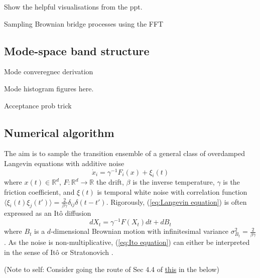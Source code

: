 Show the helpful visualisations from the ppt.

Sampling Brownian bridge processes using the FFT

\subsection{Mode-space band structure}

Mode converegnec derivation

Mode histogram figures here.

Acceptance prob trick

\subsection{Numerical algorithm} \label{sec:Numerical algorithm}
 

The aim is to sample the transition ensemble of a general class of overdamped Langevin equations with additive noise
\begin{equation} \label{eq:Langevin equation}
\dot{x}_i = \gamma^{-1} F_i(x) + \xi_i(t)
\end{equation}
where $x(t) \in \mathbb{R}^d$, $F : \mathbb{R}^d \to \mathbb{R}$ the drift, $\beta$ is the inverse temperature, $\gamma$ is the friction coefficient, and $\xi(t)$ is temporal white noise with correlation function $\langle \xi_i(t) \xi_j(t') \rangle = \frac{2}{\beta \gamma} \delta_{ij} \delta(t - t')$. Rigorously, (\ref{eq:Langevin equation}) is often expressed as an It\^{o} diffusion
\begin{equation} \label{eq:Ito equation}
dX_t = \gamma^{-1} F(X_t) dt + dB_t
\end{equation}
where $B_t$ is a $d$-dimensional Brownian motion with infinitesimal variance $\sigma_{B_t}^2 = \frac{2}{\beta \gamma}$. As the noise is non-multiplicative, (\ref{eq:Ito equation}) can either be interpreted in the sense of It\^{o} or Stratonovich \citep{itoStochasticIntegral1944,stratonovichNewRepresentationStochastic1966}.

{\color{red}
(Note to self: Consider going the route of Sec 4.4 of {\color{blue} \href{https://homepages.warwick.ac.uk/~masdr/BOOKCHAPTERS/stuart15c.pdf}{this}} in the below)
}

